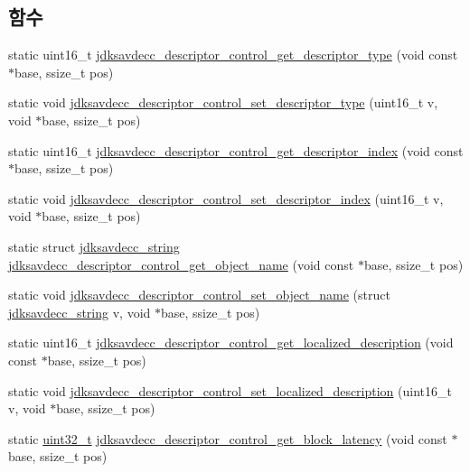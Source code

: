 \subsection*{함수}
\begin{DoxyCompactItemize}
\item 
static uint16\+\_\+t \hyperlink{group__descriptor__control_ga747cdb72ec5e1e41fd494f2f31d82c87}{jdksavdecc\+\_\+descriptor\+\_\+control\+\_\+get\+\_\+descriptor\+\_\+type} (void const $\ast$base, ssize\+\_\+t pos)
\item 
static void \hyperlink{group__descriptor__control_ga68e968a8d727416cfdf1297253c13fdb}{jdksavdecc\+\_\+descriptor\+\_\+control\+\_\+set\+\_\+descriptor\+\_\+type} (uint16\+\_\+t v, void $\ast$base, ssize\+\_\+t pos)
\item 
static uint16\+\_\+t \hyperlink{group__descriptor__control_ga4e472a9d308d354e324cdb8678504b1d}{jdksavdecc\+\_\+descriptor\+\_\+control\+\_\+get\+\_\+descriptor\+\_\+index} (void const $\ast$base, ssize\+\_\+t pos)
\item 
static void \hyperlink{group__descriptor__control_gaba952bc0c57643a5fc9b16a0e59fb7dc}{jdksavdecc\+\_\+descriptor\+\_\+control\+\_\+set\+\_\+descriptor\+\_\+index} (uint16\+\_\+t v, void $\ast$base, ssize\+\_\+t pos)
\item 
static struct \hyperlink{structjdksavdecc__string}{jdksavdecc\+\_\+string} \hyperlink{group__descriptor__control_ga8cdcbd043032b466a4734b05276aa14f}{jdksavdecc\+\_\+descriptor\+\_\+control\+\_\+get\+\_\+object\+\_\+name} (void const $\ast$base, ssize\+\_\+t pos)
\item 
static void \hyperlink{group__descriptor__control_gaa54f163c0218d1e08ef12b40fec4885f}{jdksavdecc\+\_\+descriptor\+\_\+control\+\_\+set\+\_\+object\+\_\+name} (struct \hyperlink{structjdksavdecc__string}{jdksavdecc\+\_\+string} v, void $\ast$base, ssize\+\_\+t pos)
\item 
static uint16\+\_\+t \hyperlink{group__descriptor__control_gac65cfd23f0168aed10f6f0d9b0e5ac71}{jdksavdecc\+\_\+descriptor\+\_\+control\+\_\+get\+\_\+localized\+\_\+description} (void const $\ast$base, ssize\+\_\+t pos)
\item 
static void \hyperlink{group__descriptor__control_gad50d129165fa3deb69c5012e5a6a84c2}{jdksavdecc\+\_\+descriptor\+\_\+control\+\_\+set\+\_\+localized\+\_\+description} (uint16\+\_\+t v, void $\ast$base, ssize\+\_\+t pos)
\item 
static \hyperlink{parse_8c_a6eb1e68cc391dd753bc8ce896dbb8315}{uint32\+\_\+t} \hyperlink{group__descriptor__control_ga76ad41a544a93c25d3228b85da67e1a7}{jdksavdecc\+\_\+descriptor\+\_\+control\+\_\+get\+\_\+block\+\_\+latency} (void const $\ast$base, ssize\+\_\+t pos)

\end{DoxyCompactItemize}
